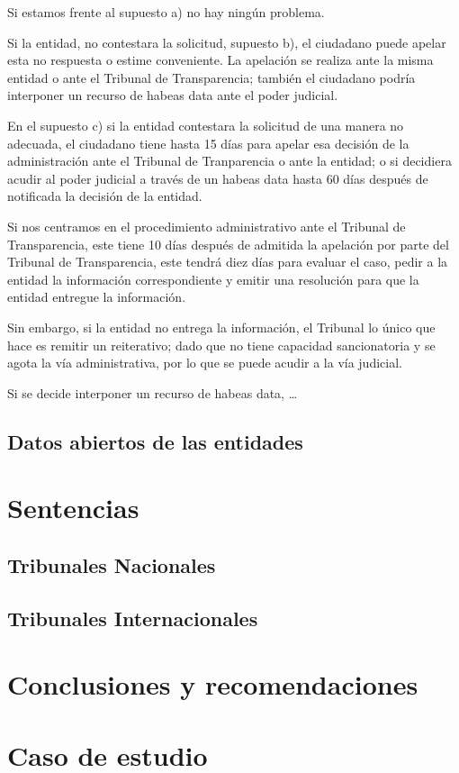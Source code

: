 \documentclass[
]{book}
\begin{document}
Si estamos frente al supuesto a) no hay ningún problema.

Si la entidad, no contestara la solicitud, supuesto b), el ciudadano puede apelar esta no respuesta o estime conveniente. La apelación se realiza ante la misma entidad o ante el Tribunal de Transparencia; también el ciudadano podría interponer un recurso de habeas data ante el poder judicial.

En el supuesto c) si la entidad contestara la solicitud de una manera no adecuada, el ciudadano tiene hasta 15 días para apelar esa decisión de la administración ante el Tribunal de Tranparencia o ante la entidad; o si decidiera acudir al poder judicial a través de un habeas data hasta 60 días después de notificada la decisión de la entidad.

Si nos centramos en el procedimiento administrativo ante el Tribunal de Transparencia, este tiene 10 días después de admitida la apelación por parte del Tribunal de Transparencia, este tendrá diez días para evaluar el caso, pedir a la entidad la información correspondiente y emitir una resolución para que la entidad entregue la información.

Sin embargo, si la entidad no entrega la información, el Tribunal lo único que hace es remitir un reiterativo; dado que no tiene capacidad sancionatoria y se agota la vía administrativa, por lo que se puede acudir a la vía judicial.

Si se decide interponer un recurso de habeas data, \ldots{}

\hypertarget{datos-abiertos-de-las-entidades}{%
\section{Datos abiertos de las entidades}\label{datos-abiertos-de-las-entidades}}

\hypertarget{sentencias}{%
\chapter{Sentencias}\label{sentencias}}

\hypertarget{tribunales-nacionales}{%
\section{Tribunales Nacionales}\label{tribunales-nacionales}}

\hypertarget{tribunales-internacionales}{%
\section{Tribunales Internacionales}\label{tribunales-internacionales}}

\hypertarget{conclusiones-y-recomendaciones}{%
\chapter{Conclusiones y recomendaciones}\label{conclusiones-y-recomendaciones}}

\hypertarget{caso-de-estudio}{%
\chapter*{Caso de estudio}\label{caso-de-estudio}}

  
\end{document}
